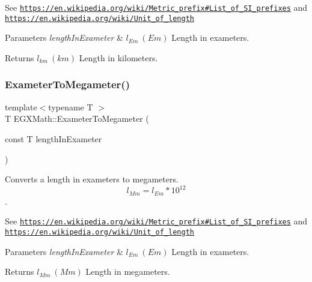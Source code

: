 See \href{https://en.wikipedia.org/wiki/Metric_prefix#List_of_SI_prefixes}{\tt https\+://en.\+wikipedia.\+org/wiki/\+Metric\+\_\+prefix\#\+List\+\_\+of\+\_\+\+S\+I\+\_\+prefixes} and \href{https://en.wikipedia.org/wiki/Unit_of_length}{\tt https\+://en.\+wikipedia.\+org/wiki/\+Unit\+\_\+of\+\_\+length} 
\begin{DoxyParams}{Parameters}
{\em length\+In\+Exameter} & $ l_{Em}\ (Em)$ Length in exameters. \\
\hline
\end{DoxyParams}
\begin{DoxyReturn}{Returns}
$ l_{km}\ (km)$ Length in kilometers. 
\end{DoxyReturn}
\mbox{\label{group___e_g_x_math-_conversions-_length_conversions-_exameter-_s_i_gac3451985da098b2668e48c30468efd83}} 
\subsubsection{\texorpdfstring{Exameter\+To\+Megameter()}{ExameterToMegameter()}}
{\footnotesize\ttfamily template$<$typename T $>$ \\
T E\+G\+X\+Math\+::\+Exameter\+To\+Megameter (\begin{DoxyParamCaption}\item[{const T}]{length\+In\+Exameter }\end{DoxyParamCaption})}



Converts a length in exameters to megameters. \[ l_{Mm}=l_{Em} * 10^{12} \]. 

See \href{https://en.wikipedia.org/wiki/Metric_prefix#List_of_SI_prefixes}{\tt https\+://en.\+wikipedia.\+org/wiki/\+Metric\+\_\+prefix\#\+List\+\_\+of\+\_\+\+S\+I\+\_\+prefixes} and \href{https://en.wikipedia.org/wiki/Unit_of_length}{\tt https\+://en.\+wikipedia.\+org/wiki/\+Unit\+\_\+of\+\_\+length} 
\begin{DoxyParams}{Parameters}
{\em length\+In\+Exameter} & $ l_{Em}\ (Em)$ Length in exameters. \\
\hline
\end{DoxyParams}
\begin{DoxyReturn}{Returns}
$ l_{Mm}\ (Mm)$ Length in megameters. 
\end{DoxyReturn}
\mbox{\label{group___e_g_x_math-_conversions-_length_conversions-_exameter-_s_i_ga367c71c371f48790004a1de30a59f2a4}} 
